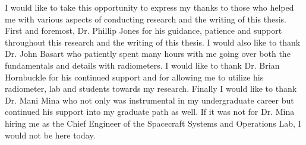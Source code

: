 
I would like to take this opportunity to express my thanks to those
who helped me with various aspects of conducting research and the writing
of this thesis.
First and foremost, Dr. Phillip Jones for his guidance, patience and support throughout this research and the writing of this thesis.
I would also like to thank Dr. John Basart who patiently spent many hours with me going over both the fundamentals and details with radiometers.
I would like to thank Dr. Brian Hornbuckle for his continued support and for allowing me to utilize his radiometer, lab and students towards my research.  
Finally I would like to thank Dr. Mani Mina who not only was instrumental in my undergraduate career but continued his support into my graduate path as well.  If it was not for Dr. Mina hiring me as the Chief Engineer of the Spacecraft Systems and Operations Lab, I would not be here today.

